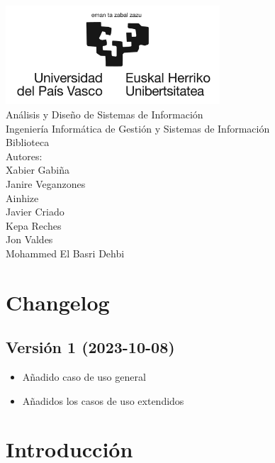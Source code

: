 \documentclass{report}
\begin{document}
    \begin{titlepage}
        \centering
        \includegraphics[width=0.6\textwidth]{./img/logo.jpg}\\
        \vspace{1cm}
        \LARGE Análisis y Diseño de Sistemas de Información\\
        \vspace{0.5cm}
        \Large Ingeniería Informática de Gestión y Sistemas de Información\\
        \vspace{3cm}
        \Huge Biblioteca\\
        \vspace{3cm}
        \Large Autores:\\
        \large Xabier Gabiña\\
        \large Janire Veganzones\\
        \large Ainhize\\
        \large Javier Criado\\
        \large Kepa Reches\\
        \large Jon Valdes\\
        \large Mohammed El Basri Dehbi\\
    \end{titlepage}

    \tableofcontents
    \chapter{Changelog}
        \section{Versión 1 (2023-10-08)}
            \begin{itemize}
                \item Añadido caso de uso general
                \item Añadidos los casos de uso extendidos
            \end{itemize}   
    \chapter{Introducción}
\end{document}
